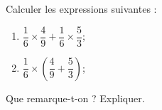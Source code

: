 
\begin{exercice}\label{exosmath-0878}

    Calculer les expressions suivantes :
    \begin{multicols}{2}
    \begin{enumerate}
        \item
            \( \dfrac{ 1 }{ 6 }\times \dfrac{ 4 }{ 9 }+\dfrac{ 1 }{ 6 }\times \dfrac{ 5 }{ 3 }\);
        \item
            \( \dfrac{ 1 }{ 6 }\times (\dfrac{ 4 }{ 9 }+\dfrac{ 5 }{ 3 })\);
    \end{enumerate}
    \end{multicols}
    Que remarque-t-on ? Expliquer.

\end{exercice}
